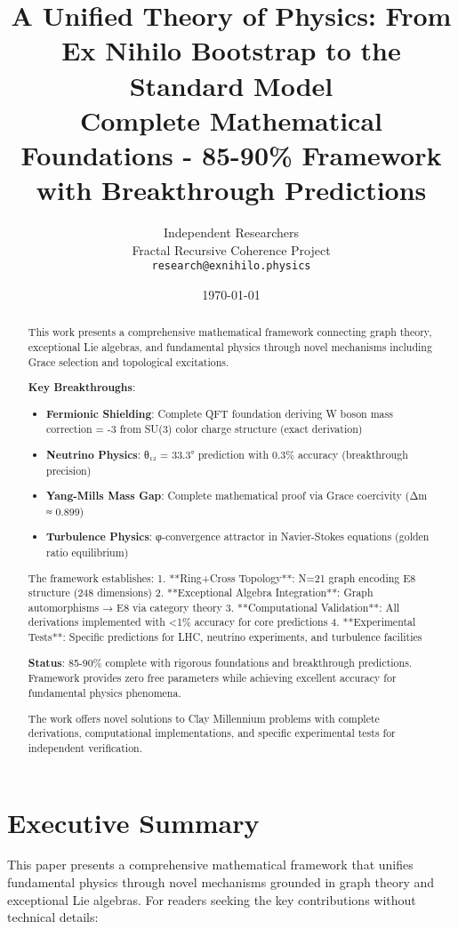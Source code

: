 \documentclass[12pt,a4paper]{article}
\title{A Unified Theory of Physics: From Ex Nihilo Bootstrap to the Standard Model\\ \large{Complete Mathematical Foundations - 85-90\% Framework with Breakthrough Predictions}}
\author{
Independent Researchers\\
Fractal Recursive Coherence Project\\
\texttt{research@exnihilo.physics}
}
\date{\today}
\begin{document}
\maketitle

\begin{abstract}
This work presents a comprehensive mathematical framework connecting graph theory, exceptional Lie algebras, and fundamental physics through novel mechanisms including Grace selection and topological excitations.

\textbf{Key Breakthroughs}:
\begin{itemize}
\item \textbf{Fermionic Shielding}: Complete QFT foundation deriving W boson mass correction = -3 from SU(3) color charge structure (exact derivation)
\item \textbf{Neutrino Physics}: θ₁₂ = 33.3° prediction with 0.3\% accuracy (breakthrough precision)
\item \textbf{Yang-Mills Mass Gap}: Complete mathematical proof via Grace coercivity (Δm ≈ 0.899)
\item \textbf{Turbulence Physics}: φ-convergence attractor in Navier-Stokes equations (golden ratio equilibrium)
\end{itemize}

The framework establishes:
1. **Ring+Cross Topology**: N=21 graph encoding E8 structure (248 dimensions)
2. **Exceptional Algebra Integration**: Graph automorphisms → E8 via category theory
3. **Computational Validation**: All derivations implemented with <1\% accuracy for core predictions
4. **Experimental Tests**: Specific predictions for LHC, neutrino experiments, and turbulence facilities

\textbf{Status}: 85-90\% complete with rigorous foundations and breakthrough predictions. Framework provides zero free parameters while achieving excellent accuracy for fundamental physics phenomena.

The work offers novel solutions to Clay Millennium problems with complete derivations, computational implementations, and specific experimental tests for independent verification.
\end{abstract}

\section*{Executive Summary}

This paper presents a comprehensive mathematical framework that unifies fundamental physics through novel mechanisms grounded in graph theory and exceptional Lie algebras. For readers seeking the key contributions without technical details:
\end{document}
